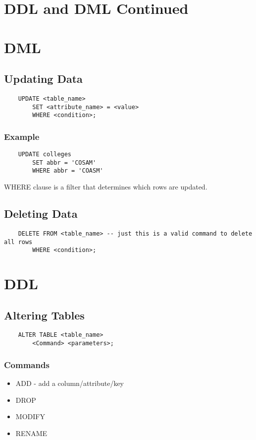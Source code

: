 \documentclass[twoside]{article}
\begin{document}
\newpage
\section{DDL and DML Continued}

\section*{DML}
\subsection*{Updating Data}
\begin{verbatim}
    UPDATE <table_name>
        SET <attribute_name> = <value>
        WHERE <condition>;
\end{verbatim}

\subsubsection*{Example}
\begin{verbatim}
    UPDATE colleges
        SET abbr = 'COSAM'
        WHERE abbr = 'COASM'
\end{verbatim}

WHERE clause is a filter that determines which rows are updated.

\subsection*{Deleting Data}
\begin{verbatim}
    DELETE FROM <table_name> -- just this is a valid command to delete all rows
        WHERE <condition>;
\end{verbatim}

\section*{DDL}
\subsection*{Altering Tables}
\begin{verbatim}
    ALTER TABLE <table_name>
        <Command> <parameters>;
\end{verbatim}
\subsubsection*{Commands}
\begin{itemize}
    \item ADD - add a column/attribute/key
    \item DROP
    \item MODIFY
    \item RENAME
\end{itemize}
\end{document}
